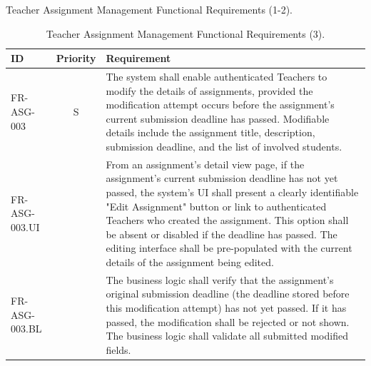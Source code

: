 \begin{table}[h]
    \centering
    \caption{Teacher Assignment Management Functional Requirements (1-2).}
    \label{tab:AssignmentManagerTeacherFR1}
\end{table}

\clearpage
\vspace*{\fill}
\begin{table}[h]
    \centering
    \begin{tabular}{|l|c|p{10cm}|}
        \hline
        \textbf{ID} & \textbf{Priority} & \textbf{Requirement} \\
        \hline
        FR-ASG-003 & S & The system shall enable authenticated Teachers to modify the details of assignments, provided the modification attempt occurs before the assignment's current submission deadline has passed. Modifiable details include the assignment title, description, submission deadline, and the list of involved students. \\
        \quad FR-ASG-003.UI &  & \quad From an assignment's detail view page, if the assignment's current submission deadline has not yet passed, the system's UI shall present a clearly identifiable "Edit Assignment" button or link to authenticated Teachers who created the assignment. This option shall be absent or disabled if the deadline has passed. The editing interface shall be pre-populated with the current details of the assignment being edited. \\
        \quad FR-ASG-003.BL &  & \quad The business logic shall verify that the assignment's original submission deadline (the deadline stored before this modification attempt) has not yet passed. If it has passed, the modification shall be rejected or not shown. The business logic shall validate all submitted modified fields. \\
        \hline
    \end{tabular}
    \caption{Teacher Assignment Management Functional Requirements (3).}
    \label{tab:AssignmentManagerTeacherFR2}
\end{table}


\vspace*{\fill}

\clearpage

